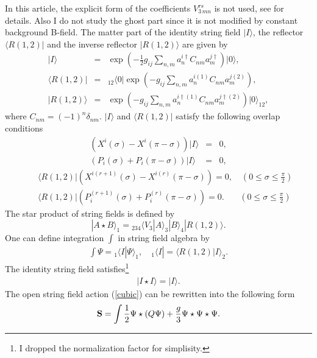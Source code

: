 \documentclass[a4paper,12pt]{article}
\def\bra{\langle}
\def\ket{\rangle}
\begin{document}
In this article, the explicit
form of the coefficients $V_{3\,mn}^{rs}$
is not used,
see \cite{GJ,Samuel,Cremmer,NOhta} for details. 
Also
I do not study
the ghost part since it is
not modified by constant background B-field.
The matter part of the 
identity string field $|I\ket $, 
the reflector $\bra R(1,2) |$ 
and the inverse reflector $|R(1,2)\ket$
are given by
\begin{eqnarray}
 \label{Istate}
|I\ket &=& 
\exp
\left(
-\frac{1}{2} g_{ij} 
\sum_{n,m}
a^{i\dagger}_n C_{nm} a_m^{j\dagger}
\right)
|0\ket, \\
\bra R(1,2)| &=&
{}_{12}\bra 0 | \exp
\left(
-g_{ij} 
\sum_{n,m}
a^{i(1)}_n C_{nm} a_m^{j(2)}
\right), \label{Ref}\\
| R(1,2) \ket
&=&
\exp
\left(
-g_{ij} 
\sum_{n,m}
a^{i \dagger (1)}_n C_{nm} a_m^{j \dagger (2)}
\right) | 0 \ket_{12},
\label{IRef}
\end{eqnarray}
where $C_{nm}=(-1)^n\delta_{nm}$.
%
%
$| I \ket$ and $\bra R(1,2)|$
satisfy the following overlap conditions
\begin{eqnarray}
 \label{overlapId}
\left(X^i(\sigma) - X^i(\pi-\sigma)\right)| I \ket &=& 0, \\
\left(P_i(\sigma) + P_i(\pi-\sigma)\right)| I \ket &=& 0,
\end{eqnarray}
\begin{eqnarray}
  \label{overlapR}
&& \bra R(1,2)| \left(X^{i(r+1)}(\sigma) - X^{i(r)}(\pi-\sigma)\right) = 0, 
\quad (0 \le \sigma \le \frac{\pi}{2})\\
&& \bra R(1,2)| \left(P_i^{(r+1)}(\sigma) + P_i^{(r)}(\pi-\sigma)\right) = 0.
\quad \,\,\,\,\, (0 \le \sigma \le \frac{\pi}{2})
\end{eqnarray}
The star product of string fields is defined by
\begin{equation}
 \label{star}
 |A\star B\ket_1=
 {}_{234}\bra V_3 |
A \ket_3 |B \ket_4 | R (1,2) \ket.
\end{equation}
One can define integration 
$\int$
in string field algebra by
\begin{eqnarray}
 \int \Psi = {}_1\langle I | \Psi \rangle_1,\quad
 {}_1\bra I | =
 \bra R(1,2) | I \ket_{2}.
\end{eqnarray}
The identity string field satisfies\footnote{%
I dropped the normalization factor for simplisity.
}
\begin{eqnarray}
 \label{identity}
|I\star  I \ket = | I \ket.
\end{eqnarray}
The open string 
field action (\ref{cubic}) can be rewritten 
into the following form 
\begin{eqnarray}
 \label{NCcubic}
\mbox{\bf S} = \int
\frac{1}{2} \Psi \star (Q \Psi)
+\frac{g}{3}  \Psi \star \Psi \star \Psi.
\end{eqnarray}
\end{document}
